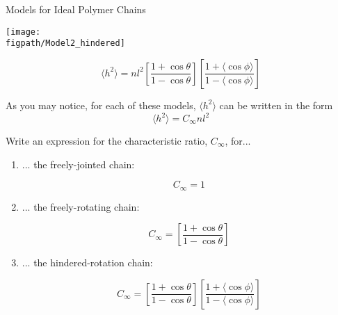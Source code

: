 \begin{activity}{Models for Ideal Polymer Chains}
\begin{model}
\begin{enumerate}
			\begin{minipage}[c]{0.45\textwidth}
				\centerline{\texttt{[image: \\figpath/Model2\_hindered]}}
			\end{minipage}\begin{minipage}[c]{0.45\textwidth}
				\begin{equation*}
					\langle h^2\rangle = n l^2 \left[\frac{1+\cos\theta}{1-\cos\theta}\right] \left[\frac{1+\langle \cos\phi\rangle}{1-\langle\cos\phi\rangle}\right]
				\end{equation*}
			\end{minipage}
			
	\end{enumerate}
	
\end{model}

\begin{ctqs}

	\question As you may notice, for each of these models, $\langle h^2\rangle$ can be written in the form \label{\labelbase:ctq:C}
		\begin{equation*}
			\langle h^2 \rangle = C_\infty n l^2
		\end{equation*}
		
		Write an expression for the characteristic ratio, $C_\infty$, for...
		
		\begin{enumerate}
			\item ... the freely-jointed chain:
	
		\begin{solution}[0.5in]{}
			\begin{equation*}
				C_\infty = 1
			\end{equation*}
		\end{solution}
			
			\item ... the freely-rotating chain:
	
		\begin{solution}[0.75in]{}
			\begin{equation*}
				C_\infty = \left[\frac{1+\cos\theta}{1-\cos\theta}\right]
			\end{equation*}
		\end{solution}
			
			\item ... the hindered-rotation chain:
	
		\begin{solution}[0.75in]{}
			\begin{equation*}
				C_\infty = \left[\frac{1+\cos\theta}{1-\cos\theta}\right] \left[\frac{1+\langle \cos\phi\rangle}{1-\langle\cos\phi\rangle}\right]
			\end{equation*}
		\end{solution}
		\end{enumerate}


\end{ctqs}
\end{activity}
